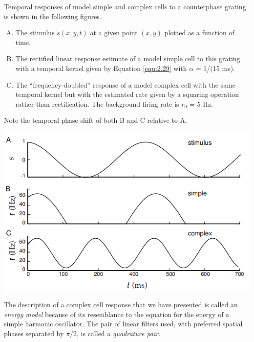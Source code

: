 \begin{exm}
  Temporal responses of model simple and complex cells to a counterphase grating is shown in the following figures.
  \begin{enumerate}[(A)]
  \item The stimulus $s(x, y,t)$ at a given point $(x, y)$ plotted as a function of time.
  \item The rectified linear response estimate of a model simple cell to this grating with a temporal kernel given by Equation \ref{equ:2.29} with $\alpha$ =  1/(15 ms).
  \item The ``frequency-doubled'' response of a model complex cell with the same temporal kernel but with the estimated rate given by a squaring operation rather than rectification. The background firing rate is $r_0$ = 5 Hz.
  \end{enumerate}
  Note the temporal phase shift of both B and C relative to A.
  \label{exm:compareSimpleComplex}
  \begin{center}
    \includegraphics[scale=0.32]{./png/compareSimpleComplex}
  \end{center}
\end{exm}

\begin{defn}
  \label{def:energyModel}
  The description of a complex cell response that we have presented is called an \emph{energy model} because of its resemblance to the equation for the energy of a simple harmonic oscillator. The pair of linear filters used, with preferred spatial phases separated by $\pi/2$, is called a \emph{quadrature pair}.
\end{defn}

